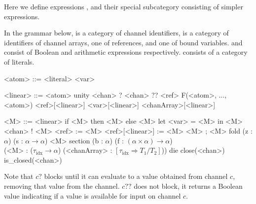 \documentclass{article}
\begin{document}
Here we define expressions , and their special subcategory
 consisting of simpler expressions.

In the grammar below,  is a category of channel identifiers,
 is a category of identifiers of channel arrays,
 one of references, and  one of bound variables.
 and  consist of Boolean and arithmetic
expressions respectively.  consists of a category of
literals.

\begin{grammar}

  <atom> ::= <literal>
  \alt <var>

  <linear> ::= <atom>
  \alt unity
  \alt <chan> ?
  \alt <chan> ??
  \alt <ref>
  \alt F(<atom>, $\ldots$, <atom>) %
  \alt <ref>[<linear>]
  \alt <var>[<linear>]
  \alt <chanArray>[<linear>]

  <M> ::= <linear>
  \alt if <M> then <M> else <M>
  \alt let <var> = <M> in <M>
  \alt <chan> ! <M>
  \alt <ref> := <M>
  \alt <ref>[<linear>] := <M> %
  \alt <M> ; <M>
  \alt fold (z : $\alpha$) (s : $\alpha \to \alpha$) <M>
  \alt section (b : $\alpha$) (f : $(\alpha \times \alpha) \to \alpha$) \\
    \qquad (<M> : ($\tau_\mathrm{idx} \to \alpha$)
      (<chanArray> : $[\tau_\mathrm{idx} \Rightarrow T_1/T_2]$))
  \alt die %
  \alt close(<chan>) %
  \alt is\_closed(<chan>) %

%
\end{grammar}

Note that $c?$ blocks until it can evaluate to a value obtained from channel
$c$, removing that value from the channel. $c??$ does not block, it returns a
Boolean value indicating if a value is available for input on channel $c$.
\end{document}
